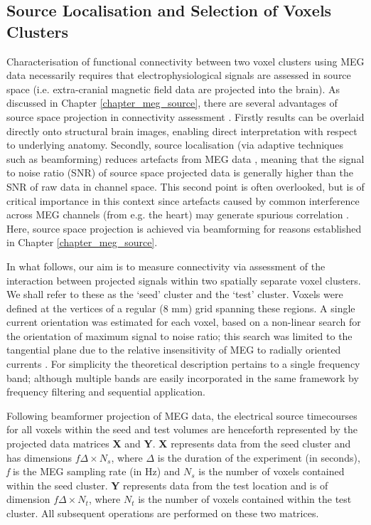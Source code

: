 \subsection{Source Localisation and Selection of Voxels Clusters}
Characterisation of functional connectivity between two voxel clusters using MEG data necessarily requires that electrophysiological signals are assessed in source space (i.e. extra-cranial magnetic field data are projected into the brain). As discussed in Chapter \ref{chapter_meg_source}, there are several advantages of source space projection in connectivity assessment \citep{Scoffelen2009}. Firstly results can be overlaid directly onto structural brain images, enabling direct interpretation with respect to underlying anatomy. Secondly, source localisation (via adaptive techniques such as beamforming) reduces artefacts from MEG data \citep{Sekihara2001,Sekihara2006}, meaning that the signal to noise ratio (SNR) of source space projected data is generally higher than the SNR of raw data in channel space. This second point is often overlooked, but is of critical importance in this context since artefacts caused by common interference across MEG channels (from e.g. the heart) may generate spurious correlation \citep{Brookes2011a}. Here, source space projection is achieved via beamforming \citep{VanVeen1997,Robinson1999,Sekihara2001,Brookes2008} for reasons established in Chapter \ref{chapter_meg_source}.

In what follows, our aim is to measure connectivity via assessment of the interaction between projected signals within two spatially separate voxel clusters. We shall refer to these as the ‘seed’ cluster and the ‘test’ cluster. Voxels were defined at the vertices of a regular (8 mm) grid spanning these regions. A single current orientation was estimated for each voxel, based on a non-linear search for the orientation of maximum signal to noise ratio; this search was limited to the tangential plane due to the relative insensitivity of MEG to radially oriented currents \citep{Robinson1999}. For simplicity the theoretical description pertains to a single frequency band; although multiple bands are easily incorporated in the same framework by frequency filtering and sequential application.

Following beamformer projection of MEG data, the electrical source timecourses for all voxels within the seed and test volumes are henceforth represented by the projected data matrices \textbf{X} and \textbf{Y}. \textbf{X} represents data from the seed cluster and has dimensions $f\Delta\times N_s$, where $\Delta$ is the duration of the experiment (in seconds), \textit{f} is the MEG sampling rate (in Hz) and $N_s$ is the number of voxels contained within the seed cluster. \textbf{Y} represents data from the test location and is of dimension  $f\Delta\times N_t$, where $N_t$ is the number of voxels contained within the test cluster. All subsequent operations are performed on these two matrices.

